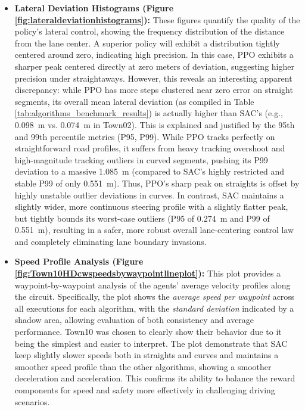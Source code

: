 \documentclass[sn-mathphys,Numbered]{sn-jnl}
\begin{document}
\begin{itemize}
    \item \textbf{Lateral Deviation Histograms (Figure \ref{fig:lateraldeviationhistograms}):} These figures quantify the quality of the policy's lateral control, showing the frequency distribution of the distance from the lane center. A superior policy will exhibit a distribution tightly centered around zero, indicating high precision.
    In this case, PPO exhibits a sharper peak centered directly at zero meters of deviation, suggesting higher precision under straightaways. However, this reveals an interesting apparent discrepancy: while PPO has more steps clustered near zero error on straight segments, its overall mean lateral deviation (as compiled in Table \ref{tab:algorithms_benchmark_results}) is actually higher than SAC's (e.g., \SI{0.098}{\meter} vs. \SI{0.074}{\meter} in Town02). This is explained and justified by the 95th and 99th percentile metrics (P95, P99). While PPO tracks perfectly on straightforward road profiles, it suffers from heavy tracking overshoot and high-magnitude tracking outliers in curved segments, pushing its P99 deviation to a massive \SI{1.085}{\meter} (compared to SAC's highly restricted and stable P99 of only \SI{0.551}{\meter}). Thus, PPO's sharp peak on straights is offset by highly unstable outlier deviations in curves. In contrast, SAC maintains a slightly wider, more continuous steering profile with a slightly flatter peak, but tightly bounds its worst-case outliers (P95 of \SI{0.274}{\meter} and P99 of \SI{0.551}{\meter}), resulting in a safer, more robust overall lane-centering control law and completely eliminating lane boundary invasions.
    \item \textbf{Speed Profile Analysis (Figure \ref{fig:Town10HDcwspeedsbywaypointlineplot}):} This plot provides a waypoint-by-waypoint analysis of the agents' average velocity profiles along the circuit. Specifically, the plot shows the \textit{average speed per waypoint} across all executions for each algorithm, with the \textit{standard deviation} indicated by a shadow area, allowing evaluation of both consistency and average performance. Town10 was chosen to clearly show their behavior due to it being the simplest and easier to interpret.
    The plot demonstrate that SAC keep slightly slower speeds both in straights and curves and maintains a smoother speed profile than the other algorithms, showing a smoother deceleration and acceleration. This confirms its ability to balance the reward components for speed and safety more effectively in challenging driving scenarios.
\end{itemize}
\end{document}
